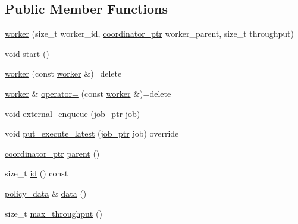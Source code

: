 \subsection*{Public Member Functions}
\begin{DoxyCompactItemize}
\item 
\hyperlink{classactor__zeta_1_1executor_1_1worker_a674d91050c8ae364156501f9abb7ecd3}{worker} (size\+\_\+t worker\+\_\+id, \hyperlink{classactor__zeta_1_1executor_1_1worker_a0f64bbb63577325b5217ccee17a28738}{coordinator\+\_\+ptr} worker\+\_\+parent, size\+\_\+t throughput)
\item 
void \hyperlink{classactor__zeta_1_1executor_1_1worker_a257ad22771ecbf3a9dbb1b2e86106893}{start} ()
\item 
\hyperlink{classactor__zeta_1_1executor_1_1worker_a67c327dc2d357864799117c8358a736e}{worker} (const \hyperlink{classactor__zeta_1_1executor_1_1worker}{worker} \&)=delete
\item 
\hyperlink{classactor__zeta_1_1executor_1_1worker}{worker} \& \hyperlink{classactor__zeta_1_1executor_1_1worker_a5ee4aa24cacffc8f620ea0094b4dbada}{operator=} (const \hyperlink{classactor__zeta_1_1executor_1_1worker}{worker} \&)=delete
\item 
void \hyperlink{classactor__zeta_1_1executor_1_1worker_acd3696b6425009eee551db3bb34b800f}{external\+\_\+enqueue} (\hyperlink{classactor__zeta_1_1executor_1_1worker_a74e3d9df71ad0b0df8d0c5403f8e642a}{job\+\_\+ptr} job)
\item 
void \hyperlink{classactor__zeta_1_1executor_1_1worker_a64480cdfc253eddf75ff0798928163c6}{put\+\_\+execute\+\_\+latest} (\hyperlink{classactor__zeta_1_1executor_1_1worker_a74e3d9df71ad0b0df8d0c5403f8e642a}{job\+\_\+ptr} job) override
\item 
\hyperlink{classactor__zeta_1_1executor_1_1worker_a0f64bbb63577325b5217ccee17a28738}{coordinator\+\_\+ptr} \hyperlink{classactor__zeta_1_1executor_1_1worker_aa3f0840f8fa873ff6300e72cbf753cfd}{parent} ()
\item 
size\+\_\+t \hyperlink{classactor__zeta_1_1executor_1_1worker_a0d3f8ce9e97f2fb78e6e0b213b620eb8}{id} () const
\item 
\hyperlink{classactor__zeta_1_1executor_1_1worker_ad8f39b0132441963ede8c1e8435aebb2}{policy\+\_\+data} \& \hyperlink{classactor__zeta_1_1executor_1_1worker_a2b687c0dde52737dd2c4701117d6abb1}{data} ()
\item 
size\+\_\+t \hyperlink{classactor__zeta_1_1executor_1_1worker_a1bfce28f14af95a760912ebc12112305}{max\+\_\+throughput} ()
\end{DoxyCompactItemize}


